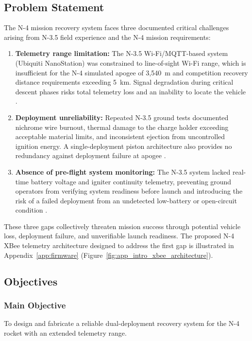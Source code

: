 \subsection{Problem Statement}

The N-4 mission recovery system faces three documented critical challenges arising from N-3.5 field experience and the N-4 mission requirements:

\begin{enumerate}
    \item \textbf{Telemetry range limitation:} The N-3.5 Wi-Fi/MQTT-based system (Ubiquiti NanoStation) was constrained to line-of-sight Wi-Fi range, which is insufficient for the N-4 simulated apogee of 3,540~m and competition recovery distance requirements exceeding 5~km. Signal degradation during critical descent phases risks total telemetry loss and an inability to locate the vehicle \cite{n3p5_recovery_report}.

    \item \textbf{Deployment unreliability:} Repeated N-3.5 ground tests documented nichrome wire burnout, thermal damage to the charge holder exceeding acceptable material limits, and inconsistent ejection from uncontrolled ignition energy. A single-deployment piston architecture also provides no redundancy against deployment failure at apogee \cite{n4_poptest_internal}.

    \item \textbf{Absence of pre-flight system monitoring:} The N-3.5 system lacked real-time battery voltage and igniter continuity telemetry, preventing ground operators from verifying system readiness before launch and introducing the risk of a failed deployment from an undetected low-battery or open-circuit condition \cite{n3p5_recovery_report}.
\end{enumerate}

These three gaps collectively threaten mission success through potential vehicle loss, deployment failure, and unverifiable launch readiness. The proposed N-4 XBee telemetry architecture designed to address the first gap is illustrated in Appendix~\ref{app:firmware} (Figure~\ref{fig:app_intro_xbee_architecture}).

\subsection{Objectives}

\subsubsection{Main Objective}
To design and fabricate a reliable dual-deployment recovery system for the N-4 rocket with an extended telemetry range.

